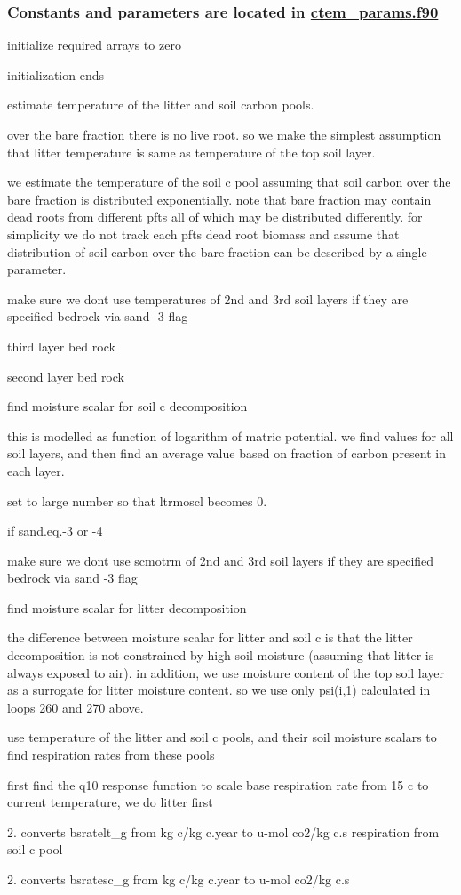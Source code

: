  \subsubsection*{Constants and parameters are located in \hyperlink{ctem__params_8f90}{ctem\+\_\+params.\+f90} }

initialize required arrays to zero

initialization ends

estimate temperature of the litter and soil carbon pools.

over the bare fraction there is no live root. so we make the simplest assumption that litter temperature is same as temperature of the top soil layer.

we estimate the temperature of the soil c pool assuming that soil carbon over the bare fraction is distributed exponentially. note that bare fraction may contain dead roots from different pfts all of which may be distributed differently. for simplicity we do not track each pft\textquotesingle{}s dead root biomass and assume that distribution of soil carbon over the bare fraction can be described by a single parameter.

make sure we don\textquotesingle{}t use temperatures of 2nd and 3rd soil layers if they are specified bedrock via sand -\/3 flag

third layer bed rock

second layer bed rock

find moisture scalar for soil c decomposition

this is modelled as function of logarithm of matric potential. we find values for all soil layers, and then find an average value based on fraction of carbon present in each layer.

set to large number so that ltrmoscl becomes 0.

if sand.\+eq.-\/3 or -\/4

make sure we don\textquotesingle{}t use scmotrm of 2nd and 3rd soil layers if they are specified bedrock via sand -\/3 flag

find moisture scalar for litter decomposition

the difference between moisture scalar for litter and soil c is that the litter decomposition is not constrained by high soil moisture (assuming that litter is always exposed to air). in addition, we use moisture content of the top soil layer as a surrogate for litter moisture content. so we use only psi(i,1) calculated in loops 260 and 270 above.

use temperature of the litter and soil c pools, and their soil moisture scalars to find respiration rates from these pools

first find the q10 response function to scale base respiration rate from 15 c to current temperature, we do litter first

2. converts bsratelt\+\_\+g from kg c/kg c.\+year to u-\/mol co2/kg c.\+s respiration from soil c pool

2. converts bsratesc\+\_\+g from kg c/kg c.\+year to u-\/mol co2/kg c.\+s 